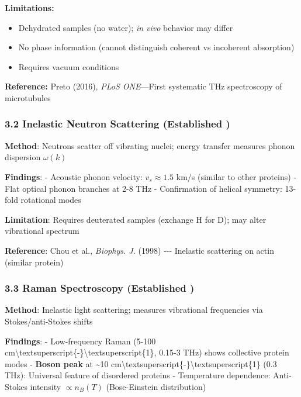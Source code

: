 \begin{warningbox}
\textbf{Limitations:}
\begin{itemize}
\item Dehydrated samples (no water); \emph{in vivo} behavior may differ
\item No phase information (cannot distinguish coherent vs incoherent absorption)
\item Requires vacuum conditions
\end{itemize}
\end{warningbox}

\textbf{Reference:} Preto (2016), \emph{PLoS ONE}---First systematic THz spectroscopy of microtubules

\subsubsection{3.2 Inelastic Neutron Scattering (Established
)}\label{inelastic-neutron-scattering-established}

\textbf{Method}: Neutrons scatter off vibrating nuclei; energy transfer
measures phonon dispersion \(\omega(k)\)

\textbf{Findings}: - Acoustic phonon velocity: \(v_s \approx 1.5\) km/s
(similar to other proteins) - Flat optical phonon branches at 2-8 THz -
Confirmation of helical symmetry: 13-fold rotational modes

\textbf{Limitation}: Requires deuterated samples (exchange H for D); may
alter vibrational spectrum

\textbf{Reference}: Chou et al., \emph{Biophys. J.} (1998) -\/-\/-
Inelastic scattering on actin (similar protein)

\subsubsection{3.3 Raman Spectroscopy (Established
)}\label{raman-spectroscopy-established}

\textbf{Method}: Inelastic light scattering; measures vibrational
frequencies via Stokes/anti-Stokes shifts

\textbf{Findings}: - Low-frequency Raman (5-100
cm\textbackslash textsuperscript\{-\}\textbackslash textsuperscript\{1\},
0.15-3 THz) shows collective protein modes - \textbf{Boson peak} at
\textasciitilde10
cm\textbackslash textsuperscript\{-\}\textbackslash textsuperscript\{1\}
(0.3 THz): Universal feature of disordered proteins - Temperature
dependence: Anti-Stokes intensity \(\propto n_B(T)\) (Bose-Einstein
distribution)

